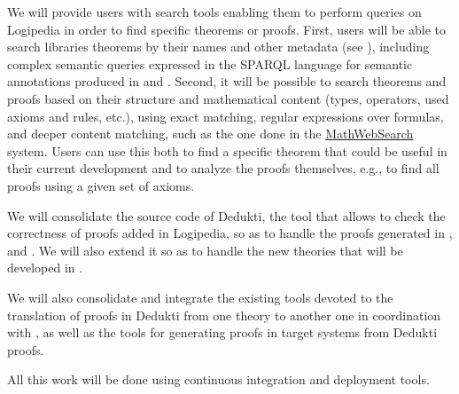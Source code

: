 \begin{workpackage}[id=access,type=RTD,wphases=1-48,
  short=Access,%
  title={Access},
  lead=Inr,InrRM=48,OcaRM=6,EduRM=12]
\begin{tasklist}
  \begin{task}[id=search,
      title=Providing search tools,
      shorttitle=Providing search tools,
      lead=Inr,InrRM=18,wphases=15-33]
    We will provide users with search tools enabling them to perform
    queries on Logipedia in order to find specific theorems or proofs.
    First, users will be able to search libraries theorems by their
    names and other metadata (see ),
    including complex semantic queries expressed in the SPARQL
    language for semantic annotations produced in
     and
    . Second, it will be possible to
    search theorems and proofs based on their structure and
    mathematical content (types, operators, used axioms and rules,
    etc.), using exact matching, regular expressions over formulas, and
    deeper content matching, such as the one done in the
    \hyperlink{https://kwarc.info/systems/mws/}{MathWebSearch}
    system. Users can use this both to find a specific theorem that
    could be useful in their current development and to analyze the
    proofs themselves, e.g., to find all proofs using a given set of
    axioms. 
  \end{task}

  \begin{task}[id=dedukti,
      title=Development of Dedukti checking and translation tools,
      shorttitle=Development of Dedukti checking and translation tools,
      lead=Inr,InrRM=18,wphases=13-36] We will consolidate the source
    code of Dedukti, the tool that allows to check the correctness of
    proofs added in Logipedia, so as to handle the proofs generated in
    ,  and . We
    will also extend it so as to handle the new theories that will be
    developed in .

    We will also consolidate and integrate the existing tools devoted
    to the translation of proofs in Dedukti from one theory to another
    one in coordination with , as well as the tools
    for generating proofs in target systems from Dedukti proofs.
    
    All this work will be done using continuous integration and
    deployment tools.
  \end{task}
  

\end{tasklist}
\end{workpackage}
